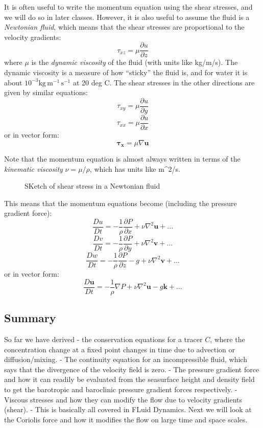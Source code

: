 It is often useful to write the momentum equation using the shear
stresses, and we will do so in later classes. However, it is also useful
to assume the fluid is a \emph{Newtonian fluid}, which means that the
shear stresses are proportional to the velocity gradients:
\[\tau_{xz} = \mu \frac{\partial u}{\partial z}\] where \(\mu\) is the
\emph{dynamic viscosity} of the fluid (with units like kg/m/s). The
dynamic viscosity is a measure of how ``sticky'' the fluid is, and for
water it is about \(10^{-3} \mathrm{kg\,m^{-1}\,s^{-1}}\) at 20 deg C.
The shear stresses in the other directions are given by similar
equations: \[\tau_{xy} = \mu \frac{\partial u}{\partial y}\]
\[\tau_{xx} = \mu \frac{\partial u}{\partial x}\] or in vector form:
\[\mathbf{\tau_x} = \mu \nabla \mathbf{u}\]

Note that the momentum equation is almost always written in terms of the
\emph{kinematic viscosity} \(\nu = \mu/\rho\), which has units like
m\^{}2/s.

\begin{figure}
\centering
\pandocbounded{}
\caption{SKetch of shear stress in a Newtonian fluid}
\end{figure}

This means that the momentum equations become (including the pressure
gradient force):
\[\frac{D u}{Dt} = -\frac{1}{\rho}\frac{\partial P}{\partial x} + \nu \nabla^2 \mathbf{u} + ...\]
\[\frac{D v}{Dt} = -\frac{1}{\rho}\frac{\partial P}{\partial y} + \nu \nabla^2 \mathbf{v} + ...\]
\[\frac{D w}{Dt} = -\frac{1}{\rho}\frac{\partial P}{\partial z} - g + \nu \nabla^2 \mathbf{v} + ...\]
or in vector form:
\[\frac{D \mathbf{u}}{Dt} = -\frac{1}{\rho}\nabla P + \nu \nabla^2 \mathbf{u} - g\mathbf{k} + ...\]

\subsection{Summary}\label{summary}

So far we have derived - the conservation equations for a tracer \(C\),
where the concentration change at a fixed point changes in time due to
advection or diffusion/mixing. - The continuity equation for an
incompressible fluid, which says that the divergence of the velocity
field is zero. - The pressure gradient force and how it can readily be
evaluated from the seasurface height and density field to get the
barotropic and baroclinic pressure gradient forces respectively. -
Viscous stresses and how they can modify the flow due to velocity
gradients (shear). - This is basically all covered in FLuid Dynamics.
Next we will look at the Coriolis force and how it modifies the flow on
large time and space scales.
